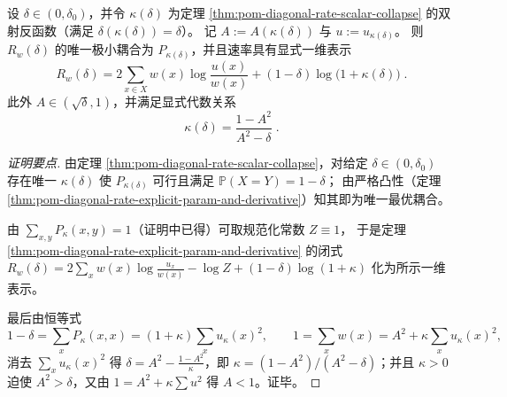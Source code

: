 \begin{corollary}[一维闭式速率与代数回收：\texorpdfstring{$\kappa=\frac{1-A^2}{A^2-\delta}$}{kappa=(1-A^2)/(A^2-delta)}]\label{cor:pom-diagonal-rate-scalar-collapse-rate}
设 \(\delta\in(0,\delta_0)\)，并令 \(\kappa(\delta)\) 为定理 \ref{thm:pom-diagonal-rate-scalar-collapse} 的双射反函数（满足 \(\delta(\kappa(\delta))=\delta\)）。
记 \(A:=A(\kappa(\delta))\) 与 \(u:=u_{\kappa(\delta)}\)。
则 \(R_w(\delta)\) 的唯一极小耦合为 \(P_{\kappa(\delta)}\)，并且速率具有显式一维表示
\[
\boxed{\;
R_w(\delta)=2\sum_{x\in X}w(x)\log\frac{u(x)}{w(x)}+(1-\delta)\log\bigl(1+\kappa(\delta)\bigr)\; }.
\]
此外 \(A\in(\sqrt\delta,1)\)，并满足显式代数关系
\[
\boxed{\;
\kappa(\delta)=\frac{1-A^2}{A^2-\delta}\; } .
\]
\end{corollary}
\begin{proof}[证明要点]
由定理 \ref{thm:pom-diagonal-rate-scalar-collapse}，对给定 \(\delta\in(0,\delta_0)\) 存在唯一 \(\kappa(\delta)\) 使 \(P_{\kappa(\delta)}\) 可行且满足 \(\mathbb P(X=Y)=1-\delta\)；
由严格凸性（定理 \ref{thm:pom-diagonal-rate-explicit-param-and-derivative}）知其即为唯一最优耦合。
\par
由 \(\sum_{x,y}P_{\kappa}(x,y)=1\)（证明中已得）可取规范化常数 \(Z\equiv 1\)，
于是定理 \ref{thm:pom-diagonal-rate-explicit-param-and-derivative} 的闭式
\(
R_w(\delta)=2\sum_x w(x)\log\frac{u_x}{w(x)}-\log Z+(1-\delta)\log(1+\kappa)
\)
化为所示一维表示。
\par
最后由恒等式
\[
1-\delta=\sum_x P_\kappa(x,x)=(1+\kappa)\sum_x u_\kappa(x)^2,
\qquad
1=\sum_x w(x)=A^2+\kappa\sum_x u_\kappa(x)^2,
\]
消去 \(\sum_x u_\kappa(x)^2\) 得
\(
\delta=A^2-\frac{1-A^2}{\kappa}
\)，即 \(\kappa=(1-A^2)/(A^2-\delta)\)；并且 \(\kappa>0\) 迫使 \(A^2>\delta\)，又由 \(1=A^2+\kappa\sum u^2\) 得 \(A<1\)。证毕。
\end{proof}

